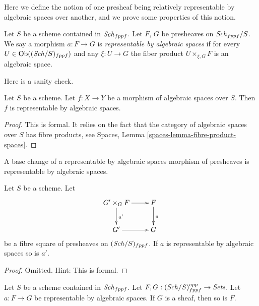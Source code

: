 \noindent
Here we define the notion of one presheaf being relatively representable
by algebraic spaces over another, and we prove some properties of this notion.

\begin{definition}
\label{definition-morphism-representable-by-spaces}
Let $S$ be a scheme contained in $\mathit{Sch}_{fppf}$.
Let $F$, $G$ be presheaves on $\mathit{Sch}_{fppf}/S$.
We say a morphism $a : F \to G$ is
{\it representable by algebraic spaces}
if for every $U \in \mathop{\mathrm{Ob}}\nolimits((\mathit{Sch}/S)_{fppf})$ and
any $\xi : U \to G$ the fiber product $U \times_{\xi, G} F$
is an algebraic space.
\end{definition}

\noindent
Here is a sanity check.

\begin{lemma}
\label{lemma-morphism-spaces-is-representable-by-spaces}
Let $S$ be a scheme.
Let $f : X \to Y$ be a morphism of algebraic spaces over $S$.
Then $f$ is representable by algebraic spaces.
\end{lemma}

\begin{proof}
This is formal. It relies on the fact that
the category of algebraic spaces over $S$ has fibre products, see
Spaces, Lemma \ref{spaces-lemma-fibre-product-spaces}.
\end{proof}

\begin{lemma}
\label{lemma-base-change-transformation}
\begin{slogan}
A base change of a representable by algebraic spaces morphism of
presheaves is representable by algebraic spaces.
\end{slogan}
Let $S$ be a scheme. Let
$$
\xymatrix{
G' \times_G F \ar[r] \ar[d]^{a'} & F \ar[d]^a \\
G' \ar[r] & G
}
$$
be a fibre square of presheaves on $(\mathit{Sch}/S)_{fppf}$.
If $a$ is representable by algebraic spaces so is $a'$.
\end{lemma}

\begin{proof}
Omitted. Hint: This is formal.
\end{proof}

\begin{lemma}
\label{lemma-representable-by-spaces-transformation-to-sheaf}
Let $S$ be a scheme contained in $\mathit{Sch}_{fppf}$.
Let $F, G : (\mathit{Sch}/S)_{fppf}^{opp} \to \textit{Sets}$.
Let $a : F \to G$ be representable by algebraic spaces.
If $G$ is a sheaf, then so is $F$.
\end{lemma}

